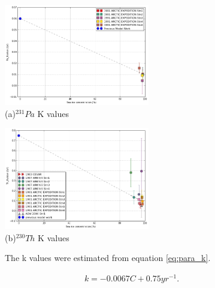 \documentclass[paper=a4, fontsize=11pt]{scrartcl} %
\numberwithin{equation}{section} %
\numberwithin{figure}{section} %
\numberwithin{table}{section} %
\begin{document}
\begin{figure}[h!]
\centering
\begin{minipage}{.51\textwidth}
  \centering
  \includegraphics[width=15pc]{Figures/Pa_k.pdf}\\(a)$^{231}Pa$ K values
\end{minipage}%
\begin{minipage}{.51\textwidth}
  \centering
  \includegraphics[width=15pc]{Figures/Th_k.pdf}\\(b)$^{230}Th$ K values
  \end{minipage}
\caption{The k values were estimated from equation \ref{eq:para_k}.}
 \label{fig:k}
\end{figure}


\begin{align}
\label{eq:para_k_th}
k=-0.0067C+0.75yr^{-1}.
\end{align}
\end{document}
